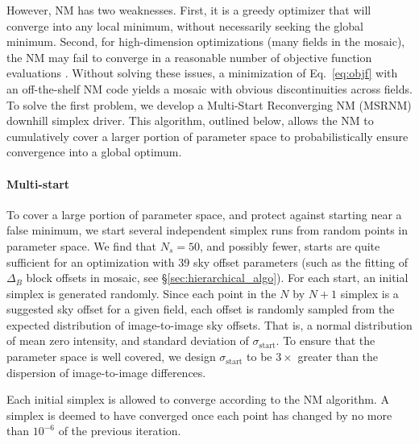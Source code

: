 \documentclass[iop]{emulateapj}
\newcommand{\Eq}[1]{Eq.~\ref{eq:#1}}  %
\newcommand{\Sec}[1]{\S\ref{sec:#1}}  %
\begin{document}
However, NM has two weaknesses.
First, it is a greedy optimizer that will converge into any local minimum, without necessarily seeking the global minimum.
Second, for high-dimension optimizations (many fields in the mosaic), the NM may fail to converge in a reasonable number of objective function evaluations \citep{Neumann:2006}.
Without solving these issues, a minimization of \Eq{objf} with an off-the-shelf NM code yields a mosaic with obvious discontinuities across fields.
To solve the first problem, we develop a Multi-Start Reconverging NM (MSRNM) downhill simplex driver.
This algorithm, outlined below, allows the NM to cumulatively cover a larger portion of parameter space to probabilistically ensure convergence into a global optimum.

\paragraph{Multi-start} To cover a large portion of parameter space, and protect against starting near a false minimum, we start several independent simplex runs from random points in parameter space.
We find that $N_s=50$, and possibly fewer, starts are quite sufficient for an optimization with 39 sky offset parameters (such as the fitting of $\Delta_B$ block offsets in mosaic, see \Sec{hierarchical_algo}).
For each start, an initial simplex is generated randomly.
Since each point in the $N$ by $N+1$ simplex is a suggested sky offset for a given field, each offset is randomly sampled from the expected distribution of image-to-image sky offsets.
That is, a normal distribution of mean zero intensity, and standard deviation of $\sigma_\mathrm{start}$.
To ensure that the parameter space is well covered, we design $\sigma_\mathrm{start}$ to be $3\times$ greater than the dispersion of image-to-image differences.

Each initial simplex is allowed to converge according to the NM algorithm.
A simplex is deemed to have converged once each point has changed by no more than $10^{-6}$ of the previous iteration.
\end{document}
